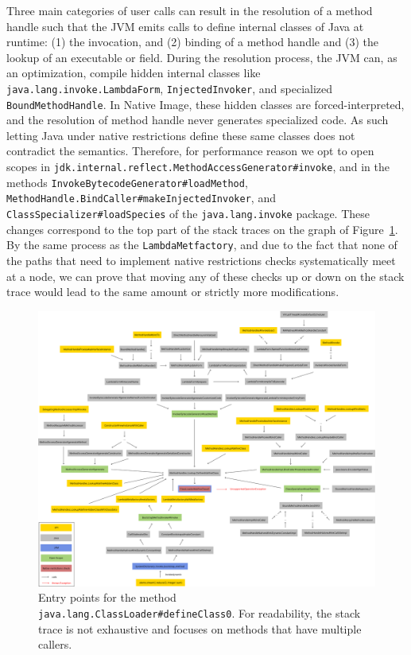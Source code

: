 Three  main categories of user calls can result in the resolution of a method handle such that the JVM emits calls to define internal classes of Java at runtime: (1) the invocation, and (2) binding of a method handle and (3) the lookup of an executable or field. During the resolution process, the JVM can, as an optimization, compile hidden internal classes like \verb|java.lang.invoke.LambdaForm|, \verb|InjectedInvoker|, and specialized \verb|BoundMethodHandle|.
In Native Image, these hidden classes are forced-interpreted, and the resolution of method handle never generates specialized code. As such letting Java under native restrictions define these same classes does not contradict the semantics. Therefore, for performance reason we opt to open scopes in \verb|jdk.internal.reflect.MethodAccessGenerator#invoke|, and in the methods \verb|InvokeBytecodeGenerator#loadMethod|, \verb|MethodHandle.BindCaller#makeInjectedInvoker|, and \verb|ClassSpecializer#loadSpecies| of the \verb|java.lang.invoke| package. These changes correspond to the top part of the stack traces on the graph of Figure~\ref{fig:define_class_0}. By the same process as the \verb|LambdaMetfactory|, and due to the fact that none of the paths that need to implement native restrictions checks systematically meet at a node, we can prove that moving any of these checks up or down on the stack trace would lead to the same amount or strictly more modifications.

\begin{figure}
    \centering
    \includegraphics[angle=90,origin=c,scale=0.35]{resources/Group 409.png}
    \caption{Entry points for the method \texttt{java.lang.ClassLoader\#defineClass0}. For readability, the stack trace is not exhaustive and focuses on methods that have multiple callers.}
    \label{fig:define_class_0}
\end{figure}

